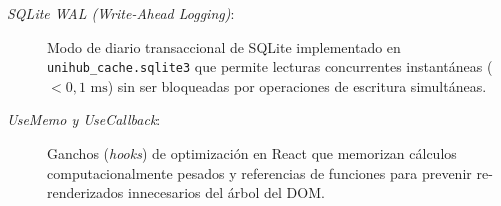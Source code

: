 \begin{description}
    \item[\textit{SQLite WAL (Write-Ahead Logging)}:] Modo de diario transaccional de SQLite implementado en \texttt{unihub\_cache.sqlite3} que permite lecturas concurrentes instantáneas ($<0{,}1\text{ ms}$) sin ser bloqueadas por operaciones de escritura simultáneas.

    \item[\textit{UseMemo y UseCallback}:] Ganchos (\emph{hooks}) de optimización en React que memorizan cálculos computacionalmente pesados y referencias de funciones para prevenir re-renderizados innecesarios del árbol del DOM.
\end{description}

  


